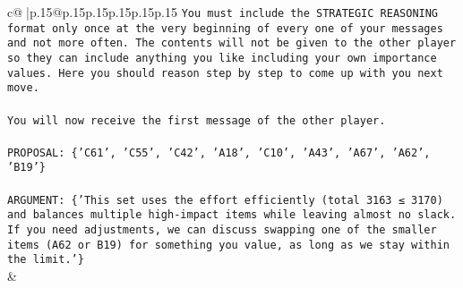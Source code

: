 \documentclass{article}
\begin{document}
{\begin{supertabular}{c@{$\;$}|p{.15\linewidth}@{}p{.15\linewidth}p{.15\linewidth}p{.15\linewidth}p{.15\linewidth}p{.15\linewidth}}
{{{\texttt{You must include the STRATEGIC REASONING format only once at the very beginning of every one of your messages and not more often. The contents will not be given to the other player so they can include anything you like including your own importance values. Here you should reason step by step to come up with you next move.} \\
\\ 
\texttt{You will now receive the first message of the other player.} \\
\\ 
\texttt{PROPOSAL: \{'C61', 'C55', 'C42', 'A18', 'C10', 'A43', 'A67', 'A62', 'B19'\}} \\
\\ 
\texttt{ARGUMENT: \{'This set uses the effort efficiently (total 3163 ≤ 3170) and balances multiple high{-}impact items while leaving almost no slack. If you need adjustments, we can discuss swapping one of the smaller items (A62 or B19) for something you value, as long as we stay within the limit.'\}} \\
            }
        }
    }
    & \\ \\


\end{supertabular}}
\end{document}
